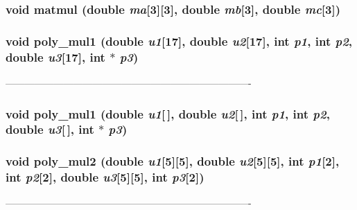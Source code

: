 \subsubsection{\setlength{\rightskip}{0pt plus 5cm}void matmul (double {\em ma}[3][3], double {\em mb}[3], double {\em mc}[3])}\label{PTripepClosure_8h_1e556d920b96c73558096d6b002aa86a}


\subsubsection{\setlength{\rightskip}{0pt plus 5cm}void poly\_\-mul1 (double {\em u1}[17], double {\em u2}[17], int {\em p1}, int {\em p2}, double {\em u3}[17], int $\ast$ {\em p3})}\label{PTripepClosure_8h_1834a14ba66ff08b7117be8e73da7d68}


---------------------------------------------------------------------------- 

\subsubsection{\setlength{\rightskip}{0pt plus 5cm}void poly\_\-mul1 (double {\em u1}[$\,$], double {\em u2}[$\,$], int {\em p1}, int {\em p2}, double {\em u3}[$\,$], int $\ast$ {\em p3})}\label{PTripepClosure_8h_093b9e305c3f4fe1b9e969d08212e74f}


\subsubsection{\setlength{\rightskip}{0pt plus 5cm}void poly\_\-mul2 (double {\em u1}[5][5], double {\em u2}[5][5], int {\em p1}[2], int {\em p2}[2], double {\em u3}[5][5], int {\em p3}[2])}\label{PTripepClosure_8h_d6da7cd180a9c4737224e61c88a33446}


---------------------------------------------------------------------------- 


